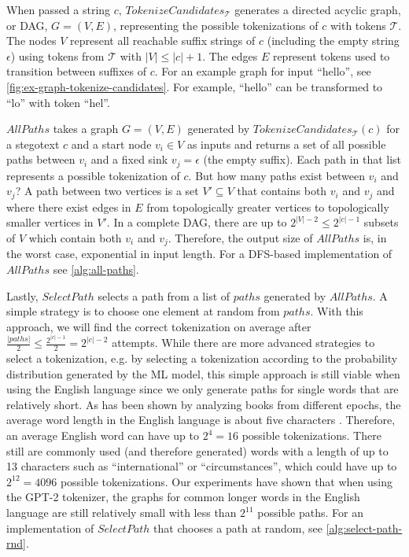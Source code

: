 When passed a string $c$, $TokenizeCandidates_{\mathcal{T}}$ generates a directed acyclic graph, or DAG, $G = (V, E)$, representing the possible tokenizations of $c$ with tokens $\mathcal{T}$.
The nodes $V$ represent all reachable suffix strings of $c$ (including the empty string $\epsilon$) using tokens from $\mathcal{T}$ with $|V| \leq |c| + 1$.
The edges $E$ represent tokens used to transition between suffixes of $c$.
For an example graph for input ``hello'', see \autoref{fig:ex-graph-tokenize-candidates}.
For example, ``hello'' can be transformed to ``lo'' with token ``hel''.

$AllPaths$ takes a graph $G = (V, E)$ generated by $TokenizeCandidates_{\mathcal{T}}(c)$ for a stegotext $c$ and a start node $v_i \in V$ as inputs and returns a set of all possible paths between $v_i$ and a fixed sink $v_j = \epsilon$ (the empty suffix).
Each path in that list represents a possible tokenization of $c$.
But how many paths exist between $v_i$ and $v_j$?
A path between two vertices is a set $V' \subseteq V$ that contains both $v_i$ and $v_j$ and where there exist edges in $E$ from topologically greater vertices to topologically smaller vertices in $V'$.
In a complete DAG, there are up to $2^{|V|-2} \leq 2^{|c|-1}$ subsets of $V$ which contain both $v_i$ and $v_j$.
Therefore, the output size of $AllPaths$ is, in the worst case, exponential in input length.
For a DFS-based implementation of $AllPaths$ see \autoref{alg:all-paths}.

Lastly, $SelectPath$ selects a path from a list of $paths$ generated by $AllPaths$.
A simple strategy is to choose one element at random from $paths$.
With this approach, we will find the correct tokenization on average after $\frac{|paths|}{2} \leq \frac{2^{|c|-1}}{2} = 2^{|c|-2}$ attempts.
While there are more advanced strategies to select a tokenization, e.g. by selecting a tokenization according to the probability distribution generated by the ML model, this simple approach is still viable when using the English language since we only generate paths for single words that are relatively short.
As has been shown by analyzing books from different epochs, the average word length in the English language is about five characters \cite{BoShSo2012}.
Therefore, an average English word can have up to $2^4 = 16$ possible tokenizations.
There still are commonly used (and therefore generated) words with a length of up to 13 characters such as ``international'' or ``circumstances'', which could have up to $2^{12} = 4096$ possible tokenizations.
Our experiments have shown that when using the GPT-2 tokenizer, the graphs for common longer words in the English language are still relatively small with less than $2^{11}$ possible paths.
For an implementation of $SelectPath$ that chooses a path at random, see \autoref{alg:select-path-rnd}.



